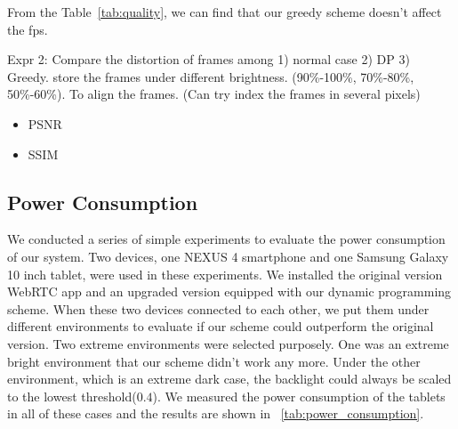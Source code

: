 From the Table~\ref{tab:quality}, we can find that our greedy scheme
doesn't affect the fps. 

  



Expr 2:
Compare the distortion of frames among 1) normal case 2) DP 3)
Greedy. store the frames under different brightness. (90\%-100\%,
70\%-80\%, 50\%-60\%).
To align the frames. (Can try index the frames in several pixels)
\begin{itemize}
  \item{PSNR}
  \item{SSIM}
\end{itemize}


\subsection{Power Consumption}
We conducted a series of simple experiments to evaluate the power
consumption of our system. Two devices, one NEXUS 4 smartphone and one
Samsung Galaxy 10 inch tablet, were used in these experiments. We
installed the original version WebRTC app and an upgraded version
equipped with our dynamic programming scheme. When these two devices
connected to each other, we put them under different environments to
evaluate if our scheme could outperform the original version. Two
extreme environments were selected purposely. One was an extreme
bright environment that our scheme didn't work any more. Under the
other environment, which is an extreme dark case, the backlight could
always be scaled to the lowest threshold($0.4$). We measured the power
consumption of the tablets in all of these cases and the results are
shown in ~\ref{tab:power_consumption}.


